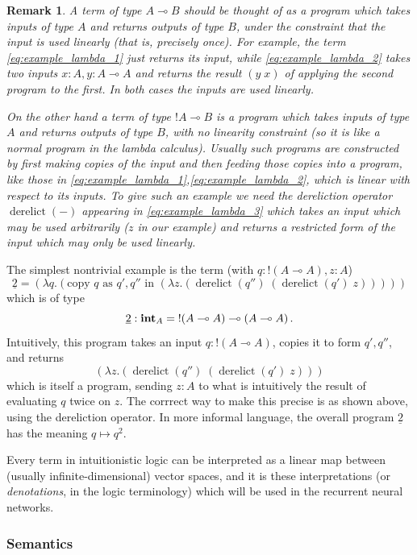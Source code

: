 \documentclass[english,letter paper,12pt,leqno]{article}
\theoremstyle{example}
\newtheorem{remark}[theorem]{Remark}
\numberwithin{equation}{section}
\def\be{\begin{equation}}
\def\ee{\end{equation}}
\DeclareMathOperator{\derelict}{derelict}
\begin{document}
\begin{remark}\label{remark:atu} A term of type $A \multimap B$ should be thought of as a program which takes inputs of type $A$ and returns outputs of type $B$, under the constraint that the input is used \emph{linearly} (that is, precisely once). For example, the term \eqref{eq:example_lambda_1} just returns its input, while \eqref{eq:example_lambda_2} takes two inputs $x:A, y:A \multimap A$ and returns the result $(y \; x)$ of applying the second program to the first. In both cases the inputs are used linearly.

On the other hand a term of type ${!} A \multimap B$ is a program which takes inputs of type $A$ and returns outputs of type $B$, with no linearity constraint (so it is like a normal program in the lambda calculus). Usually such programs are constructed by first making copies of the input and then feeding those copies into a program, like those in \eqref{eq:example_lambda_1},\eqref{eq:example_lambda_2}, which is linear with respect to its inputs. To give such an example we need the \emph{dereliction} operator $\operatorname{derelict}(-)$ appearing in \eqref{eq:example_lambda_3} which takes an input which may be used arbitrarily ($z$ in our example) and returns a restricted form of the input which may only be used linearly.
\end{remark}

The simplest nontrivial example is the term (with $q:{!}(A \multimap A), z: A$)
\be\label{eq:church_2_linearlambda}
\underline{2} = (\lambda q.(\textrm{copy $q$ as $q',q''$ in } (\lambda z. (\derelict(q'') \; (\derelict(q')\; z)))))
\ee
which is of type 
\[
\underline{2}: \textbf{int}_A = {!}(A \multimap A) \multimap (A \multimap A)\,.
\]
Intuitively, this program takes an input $q: {!}(A \multimap A)$, copies it to form $q',q''$, and returns
\[
(\lambda z. (\derelict(q'') \; (\derelict(q')\; z)))
\]
which is itself a program, sending $z:A$ to what is intuitively the result of evaluating $q$ twice on $z$. The corrrect way to make this precise is as shown above, using the dereliction operator. In more informal language, the overall program $\underline{2}$ has the meaning $q \longmapsto q^2$.

Every term in intuitionistic logic can be interpreted as a linear map between (usually infinite-dimensional) vector spaces, and it is these interpretations (or \emph{denotations}, in the logic terminology) which will be used in the recurrent neural networks.

\subsubsection{Semantics}
\end{document}
